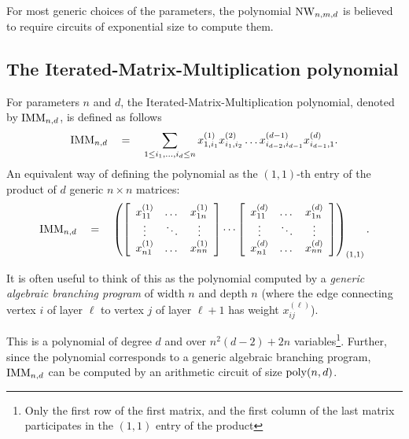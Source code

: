 For most generic choices of the parameters, the polynomial $\operatorname{\mathrm{NW}}_{n,m,d}$ is believed to require circuits of exponential size to compute them. 

\subsection*{The Iterated-Matrix-Multiplication polynomial}

For parameters $n$ and $d$, the Iterated-Matrix-Multiplication polynomial, denoted by $\operatorname{\mathrm{IMM}}_{n,d}$, is defined as follows
$$
\operatorname{\mathrm{IMM}}_{n,d} \quad = \quad \sum_{1\leq i_1,\dots, i_d\leq n} x_{1,i_1}^{(1)}x_{i_1,i_2}^{(2)}\dots x_{i_{d-2},i_{d-1}}^{(d-1)}x_{i_{d-1},1}^{(d)}.
$$
An equivalent way of defining the polynomial as the $(1,1)$-th entry of the product of $d$ generic $n\times n$ matrices:
$$
\operatorname{\mathrm{IMM}}_{n,d} \quad = \quad \left(\left[\begin{array}{ccc} x_{11}^{(1)} & \dots & x_{1n}^{(1)}\\ \vdots & \ddots & \vdots \\ x_{n1}^{(1)} & \dots & x_{nn}^{(1)}\end{array}\right] \cdots \left[\begin{array}{ccc} x_{11}^{(d)} & \dots & x_{1n}^{(d)}\\ \vdots & \ddots & \vdots \\ x_{n1}^{(d)} & \dots & x_{nn}^{(d)}\end{array}\right]\right)_{(1,1)}.
$$

It is often useful to think of this as the polynomial computed by a \emph{generic algebraic branching program} of width $n$ and depth $n$ (where the edge connecting vertex $i$ of layer $\ell$ to vertex $j$ of layer $\ell+1$ has weight $x_{ij}^{(\ell)}$). 

This is a polynomial of degree $d$ and over $n^2(d-2) + 2n$ variables\footnote{Only the first row of the first matrix, and the first column of the last matrix participates in the $(1,1)$ entry of the product}.
Further, since the polynomial corresponds to a generic algebraic branching program, $\operatorname{\mathrm{IMM}}_{n,d}$ can be computed by an arithmetic circuit of size $\operatorname{poly}(n,d)$. 


